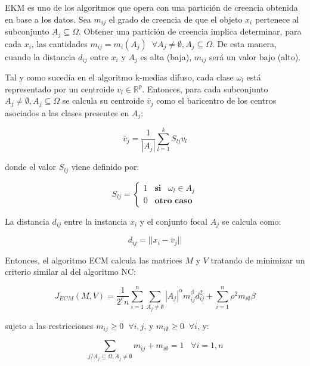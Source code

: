 EKM es uno de los algoritmos que opera con una partición de creencia obtenida en base a los datos. Sea $m_{ij}$ el grado de creencia de que el objeto $x_i$ pertenece al subconjunto $A_j \subseteq \Omega$. Obtener una partición de creencia implica determinar, para cada $x_i$, las cantidades $m_{ij} = m_i(A_j)\;\; \forall A_j \neq \emptyset, A_j \subseteq \Omega$. De esta manera, cuando la distancia $d_{ij}$ entre $x_i$ y $A_j$ es alta (baja), $m_{ij}$ será un valor bajo (alto).

Tal y como sucedía en el algoritmo k-medias difuso, cada clase $\omega_l$ está representado por un centroide $v_l \in \mathbb{R}^p$. Entonces, para cada subconjunto $A_j \neq \emptyset, A_j \subseteq \Omega$ se calcula su centroide $\bar{v}_j$ como el baricentro de los centros asociados a las clases presentes en $A_j$:

\begin{equation}
\bar{v}_j = \frac{1}{|A_j|} \sum_{l=1}^{k} S_{lj} v_l
\label{eqn11}
\end{equation}

donde el valor $S_{lj}$ viene definido por:

\begin{equation}
S_{lj} = \begin{cases}
1 \;\;\; \textbf{si} \;\;\; \omega_l \in A_j\\
0 \;\;\; \textbf{otro caso}
\end{cases}
\label{eqn12}
\end{equation}

La distancia $d_{ij}$ entre la instancia $x_i$ y el conjunto focal $A_j$ se calcula como:

\begin{equation}
d_{ij} = ||x_i - \bar{v}_j||
\label{eqn13}
\end{equation}

Entonces, el algoritmo ECM calcula las matrices $M$ y $V$ tratando de minimizar un criterio similar al del algoritmo NC:

\begin{equation}
J_{ECM}(M,V) = \frac{1}{2^cn} \sum_{i=1}^{n}\sum_{A_j \neq \emptyset} |A_j|^\alpha m_{ij}^\beta d_{ij}^2 + \sum_{i=1}^{n} \rho^2 m_{i\emptyset}\beta
\label{eqn14}
\end{equation}

sujeto a las restricciones $m_{ij} \ge 0 \;\; \forall i,j$, y $m_{i\emptyset} \ge 0 \;\; \forall i$, y:

\begin{equation}
\sum_{j/A_j \subseteq \Omega, A_j \neq \emptyset} m_{ij} + m_{i\emptyset} = 1 \;\;\; \forall i = 1,n
\label{eqn15}
\end{equation}


